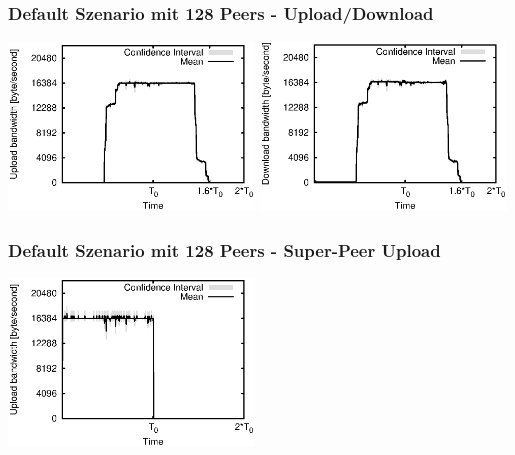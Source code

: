 \begin{frame}
  \frametitle{Default Szenario mit 128 Peers - Upload/Download}
  \begin{center}
    \includegraphics[width=0.49\textwidth]{fig/plots/scenario_4_peer_count_128/plots/GeneratedMeanCurrentUploadBandwidth.csv.eps}
    \includegraphics[width=0.49\textwidth]{fig/plots/scenario_4_peer_count_128/plots/GeneratedMeanCurrentDownloadBandwidth.csv.eps}
  \end{center}
\end{frame}


\begin{frame}
  \frametitle{Default Szenario mit 128 Peers - Super-Peer Upload}
  \begin{center}
    \includegraphics[width=0.49\textwidth]{fig/plots/scenario_4_peer_count_128/plots/GeneratedMeanCurrentSuperSeederUploadBandwidth.csv.eps}
  \end{center}
\end{frame}


